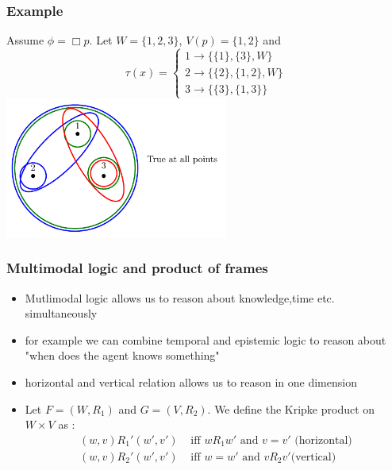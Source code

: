 \documentclass[hyperref={pdfpagelabels=false},t,10pt]{beamer}
\begin{document}
\begin{frame}
  \frametitle{Example}
      Assume $\phi = \Box p$. Let $W = \{1,2,3\}$, $V(p) = \{1,2\}$ and 
    \[
            \tau(x) = 
            \begin{cases}
                1 \rightarrow \{\{1\}, \{3\}, W\} \\
                2 \rightarrow \{\{2\}, \{1,2\}, W\} \\
                3 \rightarrow \{\{3\}, \{1,3\}\}
            \end{cases}
    \] 
    \centering
      \includegraphics[width=0.55\textwidth]{Example3.pdf}
\end{frame}

\begin{frame}
  \frametitle{Multimodal logic and product of frames}
  \begin{itemize}
    \item Mutlimodal logic allows us to reason about knowledge,time etc. simultaneously 
    \item for example we can combine temporal and epistemic logic to reason about "when does the agent knows something" \pause
    \item horizontal and vertical relation allows us to reason in one dimension%
    \item Let $F = (W, R_1)$ and $G = (V, R_2)$. We define the Kripke product on $W \times V$ as : 
      \begin{align*}
              (w,v)R_1'(w',v') &\text{ iff } wR_1w' \mbox{ and } v = v' \text{  (horizontal)} \\
              (w,v)R_2  '(w',v') &\text{ iff } w = w' \mbox{ and } vR_2v' \text{(vertical)}
      \end{align*}

  \end{itemize}
\end{frame}
\end{document}
